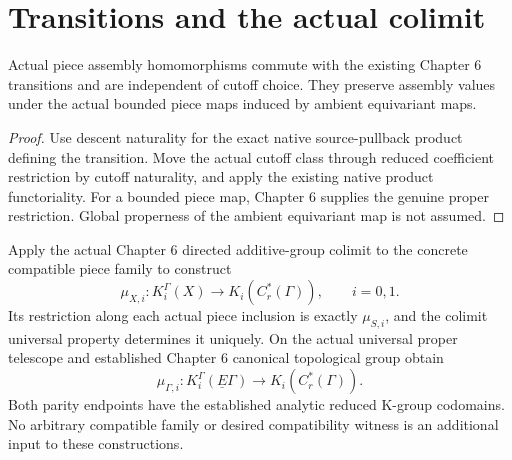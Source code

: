 \section{Transitions and the actual colimit}

\begin{proposition}\label{prop:piece-assembly-transition}
\leanok
Actual piece assembly homomorphisms commute with the existing Chapter 6
transitions and are independent of cutoff choice. They preserve assembly
values under the actual bounded piece maps induced by ambient equivariant
maps.
\end{proposition}
\begin{proof}
\leanok
Use descent naturality for the exact native source-pullback product
defining the transition. Move the actual cutoff class through reduced
coefficient restriction by cutoff naturality, and apply the existing native
product functoriality. For a bounded piece map, Chapter 6 supplies the genuine
proper restriction. Global properness of the ambient equivariant map is not
assumed.
\end{proof}


\begin{definition}\label{def:assembly-map}
\leanok
Apply the actual Chapter 6 directed additive-group colimit to the concrete
compatible piece family to construct
\[
 \mu_{X,i}:K_i^\Gamma(X)\longrightarrow K_i(C_r^*(\Gamma)),\qquad i=0,1.
\]
Its restriction along each actual piece inclusion is exactly $\mu_{S,i}$,
and the colimit universal property determines it uniquely. On the actual
universal proper telescope and established Chapter 6 canonical topological
group obtain
\[
 \mu_{\Gamma,i}:K_i^\Gamma(\underline E\Gamma)\longrightarrow K_i(C_r^*(\Gamma)).
\]
Both parity endpoints have the established analytic reduced K-group
codomains. No arbitrary compatible family or desired compatibility witness
is an additional input to these constructions.
\end{definition}


